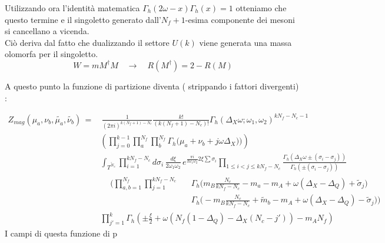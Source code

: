 \documentclass[a4paper,12pt]{article}
\begin{document}
Utilizzando ora l'identità matematica $ \Gamma_h ( 2 \omega - x  ) \Gamma_h ( x  ) =  1 $ otteniamo che questo termine e il singoletto generato dall'$N_f+1$-esima componente dei mesoni si cancellano a vicenda.\\
Ciò deriva dal fatto che dualizzando il settore $U(k)$ viene generata una massa olomorfa per il singoletto. 
\begin{equation}
	W = m M^{\dagger} M \quad \longrightarrow \quad R(M^{\dagger}) = 2 - R (M)
\end{equation}

A questo punto la funzione di partizione diventa ( strippando i fattori divergenti) :

\begin{align*}
Z_{mag} ( \mu_a , \nu_b , \tilde{\mu_a}, \tilde{\nu_b} ) \,= & \, \frac{1}{(2 \pi i )^{k(N_f+1) - N_c}}\frac{k!}{ (k(N_f+1) - N_c)! }
 \Gamma_h ( \Delta_X \omega ; \omega_1 , \omega_2)^{ k N_f - N_c -1}  \\
 &  \left( \prod_{j=0}^{k-1} 
\prod_a^{N_f } \prod_b^{N_f}  \Gamma_h \big( \mu_a+  \nu_b + j \omega \Delta_X) \big)  \right) \\
&\int_{T^{\tilde{N}_c}}  \prod_{i=1}^{ k N_f - N_c } d \sigma_i \, 
\frac{d \xi}{2 \omega_1 \omega_2} \, e^{ \frac{\pi i }{ 2 \omega_1 \omega_2} 2 \xi  \sum \sigma_i }  \prod_{ 1 \leq i<j \leq k N_f - N_c } \frac{ \Gamma_h( \Delta_X \omega \pm (\sigma_i - \sigma_j)) }{ \Gamma_h ( \pm (\sigma_i - \sigma_j) )} 
  \\&
\begin{aligned}
   &  \bigg( \prod_{a,b=1}^{N_f} \prod_{j=1}^{k N_f - N_c }  	
   && \Gamma_h \big( m_B \frac{N_c}{ k N_f-N_c} - m_a - m_A + \omega (\Delta_X - \Delta_Q)  + \tilde{\sigma}_j \big) \\
 & && \Gamma_h \big(  -m_B \frac{N_c}{k N_f-N_c} + \tilde{m}_b - m_A + \omega (\Delta_X - \Delta_Q)  - \tilde{\sigma}_j \big)  \bigg)
  \end{aligned}
  \\
  & \prod_{j'=1}^{k} \Gamma_h \left( \pm \frac{\xi}{2} +\omega \left( 
  N_f ( 1 - \Delta_Q ) - \Delta_X ( N_c - j')  \right) - m_A N_f 
 \right) 
\end{align*}
I campi di questa funzione di p
\newpage


\end{document}
